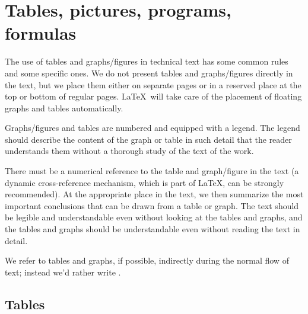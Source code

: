 \chapter{Tables, pictures, programs, formulas}

The use of tables and graphs/figures in technical text has some common rules and 
some specific ones. We do not present tables and graphs/figures directly in the 
text, but we place them either on separate pages or in a reserved place at the 
top or bottom of regular pages. \LaTeX\ will take care of the placement of 
floating graphs and tables automatically.

Graphs/figures and tables are numbered and equipped with a legend. The legend 
should describe the content of the graph or table in such detail that the reader 
understands them without a thorough study of the text of the work.

There must be a numerical reference to the table and graph/figure in the text (a 
dynamic cross-reference mechanism, which is part of \LaTeX, can be strongly 
recommended). At the appropriate place in the text, we then summarize the most 
important conclusions that can be drawn from a table or graph. The text should 
be legible and understandable even without looking at the tables and graphs, and 
the tables and graphs should be understandable even without reading the text in 
detail.

We refer to tables and graphs, if possible, indirectly during the normal flow of 
text; instead \emph{} we'd rather write \emph{}.

\section{Tables}

